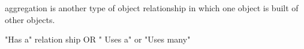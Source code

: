 aggregation is another type of object relationship in which one object is built of other objects.

"Has a" relation ship  OR " Uses a" or "Uses many"
